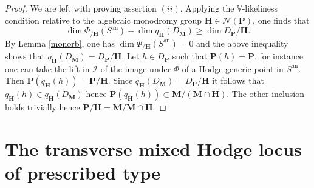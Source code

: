 \documentclass[10pt]{article}
\numberwithin{equation}{subsection}
\theoremstyle{plain}
\theoremstyle{definition}
\theoremstyle{remark}
\newcommand{\I}{\mathscr{I}}
\newcommand{\V}{\mathbb V}
\newcommand{\pp}{\mathbf P}
\newcommand{\mon}{\mathbf H}
\newcommand{\M}{\mathbf M}
\newcommand{\an}{\mathrm{an}}
\newcommand{\Np}{\mathcal{N}(\pp)}
\begin{document}
\begin{proof}
We are left with proving assertion $(ii)$. Applying the $\V$-likeliness condition relative to the algebraic monodromy group $\mon \in \Np$, one finds that 
\[
\dim \Phi_{/\mon}(S^\an) + \dim q_\mon(D_\M) \geqslant \dim D_\pp/\mon.
\]
By Lemma \ref{monorb}, one has $\dim \Phi_{/\mon}(S^\an) = 0$ and the above inequality shows that $q_\mon(D_\M) = D_\pp/\mon$. Let $h \in D_\pp$ such that $\pp(h) = \pp$, for instance one can take the lift in $\I$ of the image under $\Phi$ of a Hodge generic point in $S^\an$. Then $\pp(q_\mon(h)) = \pp/\mon$. Since $q_\mon(D_\M) = D_\pp/\mon$ it follows that $q_\mon(h) \in q_\mon(D_\M)$ hence $\pp(q_\mon(h)) \subset \M/(\M \cap \mon)$.  The other inclusion holds trivially hence $\pp/\mon = \M/\M \cap \mon$.
\end{proof}
\section{The transverse mixed Hodge locus of prescribed type}\label{sect8}
\end{document}
